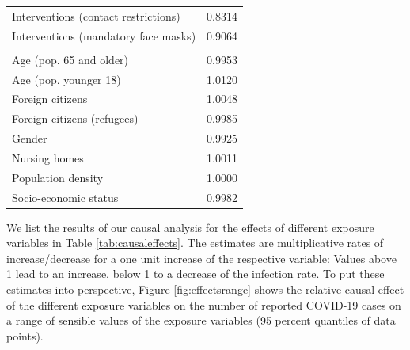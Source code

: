 \documentclass[]{elsarticle} %
\begin{document}
\begin{table}
\begin{tabular}[t]{lr}
\hspace{1em}Interventions (contact restrictions) & 0.8314\\
\hspace{1em}Interventions (mandatory face masks) & 0.9064\\
\addlinespace[0.3em]
\multicolumn{2}{l}{\textbf{Demographic}}\\
\hspace{1em}Age (pop. 65 and older) & 0.9953\\
\hspace{1em}Age (pop. younger 18) & 1.0120\\
\hspace{1em}Foreign citizens & 1.0048\\
\hspace{1em}Foreign citizens (refugees) & 0.9985\\
\hspace{1em}Gender & 0.9925\\
\hspace{1em}Nursing homes & 1.0011\\
\hspace{1em}Population density & 1.0000\\
\hspace{1em}Socio-economic status & 0.9982\\
\bottomrule
\end{tabular}
\end{table}

We list the results of our causal analysis for the effects of different exposure variables in Table \ref{tab:causaleffects}. The estimates are multiplicative rates of increase/decrease for a one unit increase of the respective variable: Values above 1 lead to an increase, below 1 to a decrease of the infection rate. To put these estimates into perspective, Figure \ref{fig:effectsrange} shows the relative causal effect of the different exposure variables on the number of reported COVID-19 cases on a range of sensible values of the exposure variables (95 percent quantiles of data points).
\end{document}
